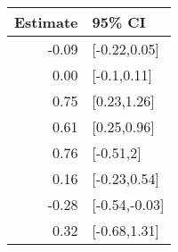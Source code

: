 \begin{tabular}{rl}
  \hline
Estimate & 95\% CI \\ 
  \hline
-0.09 & [-0.22,0.05] \\ 
  0.00 & [-0.1,0.11] \\ 
  0.75 & [0.23,1.26] \\ 
  0.61 & [0.25,0.96] \\ 
  0.76 & [-0.51,2] \\ 
  0.16 & [-0.23,0.54] \\ 
  -0.28 & [-0.54,-0.03] \\ 
  0.32 & [-0.68,1.31] \\ 
   \hline
\end{tabular}

